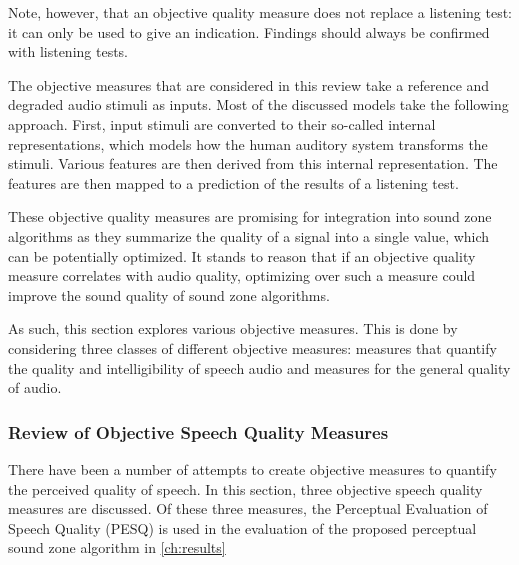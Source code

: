 Note, however, that an objective quality measure does not replace a listening test: it can only be used to give an 
indication.
Findings should always be confirmed with listening tests.

The objective measures that are considered in this review take a reference and degraded audio stimuli as inputs.
Most of the discussed models take the following approach.
First, input stimuli are converted to their so-called internal representations, which models how the 
human auditory system transforms the stimuli.
Various features are then derived from this internal representation.
The features are then mapped to a prediction of the results of a listening test.

These objective quality measures are promising for integration into sound zone algorithms as they summarize the 
quality of a signal into a single value, which can be potentially optimized. 
It stands to reason that if an objective quality measure correlates with audio quality, optimizing over such a measure
could improve the sound quality of sound zone algorithms.

As such, this section explores various objective measures.
This is done by considering three classes of different objective measures: measures that quantify the quality and intelligibility of speech audio and measures for the general quality of audio. 

\subsubsection{Review of Objective Speech Quality Measures}
There have been a number of attempts to create objective measures to quantify the perceived quality of speech.
In this section, three objective speech quality measures are discussed.
Of these three measures, the Perceptual Evaluation of Speech Quality (PESQ) is used in the evaluation of the proposed perceptual sound zone algorithm in \autoref{ch:results}

